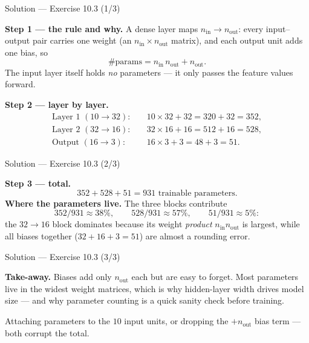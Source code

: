 \documentclass[aspectratio=169,11pt]{beamer}
\begin{document}
\begin{frame}{Solution --- Exercise 10.3 (1/3)}
\begin{solutionbox}
  \textbf{Step 1 --- the rule and why.} A dense layer maps
  $n_{\text{in}} \to n_{\text{out}}$: every input--output pair carries one
  weight (an $n_{\text{in}} \times n_{\text{out}}$ matrix), and each output
  unit adds one bias, so
  \[
    \#\text{params} = n_{\text{in}}\, n_{\text{out}} + n_{\text{out}} .
  \]
  The input layer itself holds \emph{no} parameters --- it only passes the
  feature values forward.

  \medskip
  \textbf{Step 2 --- layer by layer.}
  \[
    \begin{aligned}
      \text{Layer 1 } (10 \to 32): &\quad 10 \times 32 + 32 = 320 + 32 = 352, \\
      \text{Layer 2 } (32 \to 16): &\quad 32 \times 16 + 16 = 512 + 16 = 528, \\
      \text{Output } (16 \to 3):   &\quad 16 \times 3  + 3  = 48  + 3  = 51 .
    \end{aligned}
  \]
\end{solutionbox}
\end{frame}

\begin{frame}{Solution --- Exercise 10.3 (2/3)}
\begin{solutionbox}
  \textbf{Step 3 --- total.}
  \[
    352 + 528 + 51 = \boxed{931} \text{ trainable parameters.}
  \]
  \textbf{Where the parameters live.} The three blocks contribute
  \[
    352/931 \approx 38\%, \qquad 528/931 \approx 57\%, \qquad 51/931 \approx 5\%:
  \]
  the $32 \to 16$ block dominates because its weight \emph{product}
  $n_{\text{in}} n_{\text{out}}$ is largest, while all biases together
  ($32 + 16 + 3 = 51$) are almost a rounding error.
\end{solutionbox}
\end{frame}

\begin{frame}{Solution --- Exercise 10.3 (3/3)}
\begin{solutionbox}
  \medskip
  \textbf{Take-away.} Biases add only $n_{\text{out}}$ each but are
  easy to forget. Most parameters live in the widest weight matrices,
  which is why hidden-layer width drives model size --- and why parameter
  counting is a quick sanity check before training.

\end{solutionbox}
\begin{mistake}
  Attaching parameters to the $10$ input units, or dropping the
  $+n_{\text{out}}$ bias term --- both corrupt the total.
\end{mistake}
\end{frame}
\end{document}

